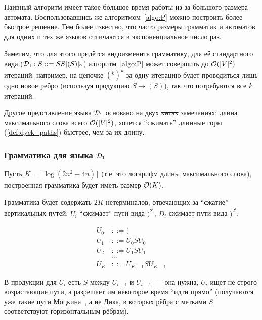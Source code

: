 
Наивный алгоритм имеет такое большое время работы из-за большого размера автомата. Воспользовавшись же алгоритмом~\ref{algo:P} можно построить более быстрое решение. Тем более известно, что часто размеры грамматик и автоматов для одних и тех же языков отличаются в экспоненциальное число раз.

Заметим, что для этого придётся видоизменить грамматику, для её стандартного вида ($\mathcal{D}_1 : S ::= SS | ( S ) | \varepsilon$) алгоритм~\ref{algo:P} может совершить до $\mathcal{O}(|V|^2)$ итераций: например, на цепочке $(^k )^k$ за одну итерацию будет проводиться лишь одно новое ребро (используя продукцию $S \to ( S )$), так что потребуются все $k$ итераций.

Другое представление языка $\mathcal{D}_1$ основано на двух \sout{китах} замечаниях: длина максимального слова всего $\mathcal{O}(|V|^2)$, хочется ``сжимать'' длинные горы (\ref{def:dyck_paths}) быстрее, чем за их длину.

\subsubsection{Грамматика для языка $\mathcal{D}_1$}


Пусть $K = \lceil \log (2 n^2 + 4n) \rceil$ (т.е. это логарифм длины максимального слова), построенная грамматика будет иметь размер $\mathcal{O}(K)$.

Грамматика будет содержать $2K$ нетерминалов, отвечающих за ``сжатие'' вертикальных путей: $U_i$ ``сжимает'' пути вида $(^{2^i}$, $D_i$ сжимает пути вида $)^{2^i}$:

\begin{align*}\label{eq:U}
  U_0 &::= ( \\
  U_1 &::= U_0 S U_0 \\
  U_2 &::= U_1 S U_1 \\
  &\dots \\
  U_K &::= U_{K-1} S U_{K-1} 
\end{align*}

В продукции для $U_i$ есть $S$ между $U_{i-1}$ и $U_{i-1}$~--- она нужна, $U_i$ ищет не строго возрастающие пути, а разрешает им некоторое время ``идти прямо'' (получаются уже такие пути Моцкина~\cite{Donaghey1977}, а не Дика, в которых рёбра с метками $S$ соответствуют горизонтальным рёбрам).

